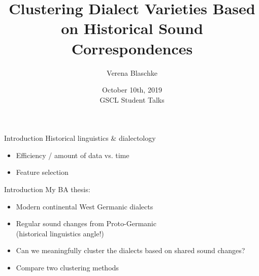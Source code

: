 \documentclass[xcolor={dvipsnames}]{beamer}
\title{Clustering Dialect Varieties Based on Historical Sound Correspondences}
\author{Verena Blaschke}
\date{October 10th, 2019\\GSCL Student Talks}
\newcommand{\hugeSymbol}[1]{{\fontsize{35}{42}\selectfont #1}}
\begin{document}
\begin{frame}
  \titlepage
\end{frame}


\begin{frame}{Introduction}
Historical linguistics \& dialectology

\vspace{2em}

\hspace{0.15\textwidth}\hugeSymbol{\faBook}\hspace{0.15\textwidth}\hugeSymbol{\faArrowsH}\hspace{0.15\textwidth}\hugeSymbol{\faLaptop}

\vspace{1em}

\begin{itemize}
    \item Efficiency / amount of data vs. time
    \item Feature selection
\end{itemize}
\end{frame}

\begin{frame}{Introduction}
My BA thesis:
\vspace{1em}
\begin{itemize}
    \item Modern continental West Germanic dialects
    \item Regular sound changes from Proto-Germanic\\(historical linguistics angle!)
    \vspace{1em}
    \item Can we meaningfully cluster the dialects based on shared sound changes?
    \item Compare two clustering methods
\end{itemize}
\end{frame}
\end{document}
